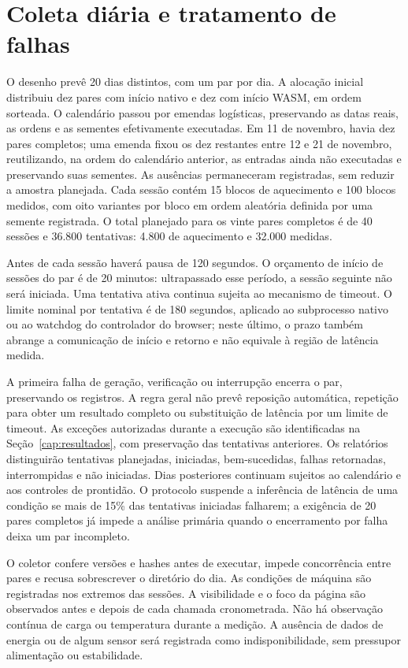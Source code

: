 \section{Coleta diária e tratamento de falhas}

O desenho prevê 20 dias distintos, com um par por dia. A alocação inicial distribuiu dez pares com início nativo e dez com início WASM, em ordem sorteada. O calendário passou por emendas logísticas, preservando as datas reais, as ordens e as sementes efetivamente executadas. Em 11 de novembro, havia dez pares completos; uma emenda fixou os dez restantes entre 12 e 21 de novembro, reutilizando, na ordem do calendário anterior, as entradas ainda não executadas e preservando suas sementes. As ausências permaneceram registradas, sem reduzir a amostra planejada. Cada sessão contém 15 blocos de aquecimento e 100 blocos medidos, com oito variantes por bloco em ordem aleatória definida por uma semente registrada. O total planejado para os vinte pares completos é de 40 sessões e 36.800 tentativas: 4.800 de aquecimento e 32.000 medidas.

Antes de cada sessão haverá pausa de 120 segundos. O orçamento de início de sessões do par é de 20 minutos: ultrapassado esse período, a sessão seguinte não será iniciada. Uma tentativa ativa continua sujeita ao mecanismo de timeout. O limite nominal por tentativa é de 180 segundos, aplicado ao subprocesso nativo ou ao watchdog do controlador do browser; neste último, o prazo também abrange a comunicação de início e retorno e não equivale à região de latência medida.

A primeira falha de geração, verificação ou interrupção encerra o par, preservando os registros. A regra geral não prevê reposição automática, repetição para obter um resultado completo ou substituição de latência por um limite de timeout. As exceções autorizadas durante a execução são identificadas na Seção~\ref{cap:resultados}, com preservação das tentativas anteriores. Os relatórios distinguirão tentativas planejadas, iniciadas, bem-sucedidas, falhas retornadas, interrompidas e não iniciadas. Dias posteriores continuam sujeitos ao calendário e aos controles de prontidão. O protocolo suspende a inferência de latência de uma condição se mais de 15\% das tentativas iniciadas falharem; a exigência de 20 pares completos já impede a análise primária quando o encerramento por falha deixa um par incompleto.

O coletor confere versões e hashes antes de executar, impede concorrência entre pares e recusa sobrescrever o diretório do dia. As condições de máquina são registradas nos extremos das sessões. A visibilidade e o foco da página são observados antes e depois de cada chamada cronometrada. Não há observação contínua de carga ou temperatura durante a medição. A ausência de dados de energia ou de algum sensor será registrada como indisponibilidade, sem pressupor alimentação ou estabilidade.

